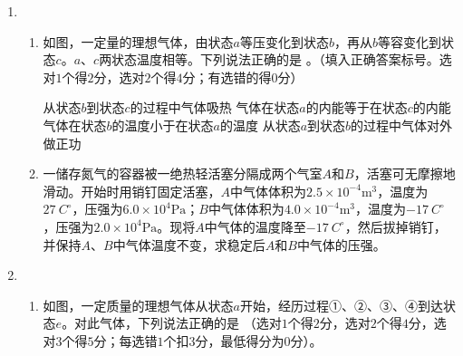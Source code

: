 \begin{enumerate}[leftmargin=0em]
\newpage
\item
{}
\begin{enumerate}
\renewcommand{\labelenumi}{\arabic{enumi}.}
\item
如图，一定量的理想气体，由状态$ a $等压变化到状态$ b $，再从$ b $等容变化到状态$ c $。$ a $、$ c $两状态温度相等。下列说法正确的是  
。（填入正确答案标号。选对$ 1 $个得$ 2 $分，选对$ 2 $个得$ 4 $分；有选错的得$ 0 $分）
\begin{figure}[h!]
\centering

\end{figure}


\fourchoices
{从状态$ b $到状态$ c $的过程中气体吸热}
{气体在状态$ a $的内能等于在状态$ c $的内能}
{气体在状态$ b $的温度小于在状态$ a $的温度}
{从状态$ a $到状态$ b $的过程中气体对外做正功}


\item 
一储存氮气的容器被一绝热轻活塞分隔成两个气室$ A $和$ B $，活塞可无摩擦地滑动。开始时用销钉固定活塞，$ A $中气体体积为$2.5 \times 10 ^ { - 4 } \mathrm { m } ^ { 3 }$，温度为$ 27\ C^{\circ} $，压强为$6.0 \times 10 ^ { 4 } \mathrm { Pa }$；$ B $中气体体积为$4.0 \times 10 ^ { - 4 } \mathrm { m } ^ { 3 }$，温度为$ -17\ C^{\circ} $，压强为$2.0 \times 10 ^ { 4 } \mathrm { Pa }$。现将$ A $中气体的温度降至$ -17\ C^{\circ} $，然后拔掉销钉，并保持$ A $、$ B $中气体温度不变，求稳定后$ A $和$ B $中气体的压强。






\end{enumerate}



\newpage
\item 
{}
\begin{enumerate}
\renewcommand{\labelenumi}{\arabic{enumi}.}
\item
如图，一定质量的理想气体从状态$ a $开始，经历过程①、②、③、④到达状态$ e $。对此气体，下列说法正确的是  
（选对$ 1 $个得$ 2 $分，选对$ 2 $个得$ 4 $分，选对$ 3 $个得$ 5 $分；每选错$ 1 $个扣$ 3 $分，最低得分为$ 0 $分）。
\begin{figure}[h!]
\centering

\end{figure}


\end{enumerate}
\end{enumerate}
